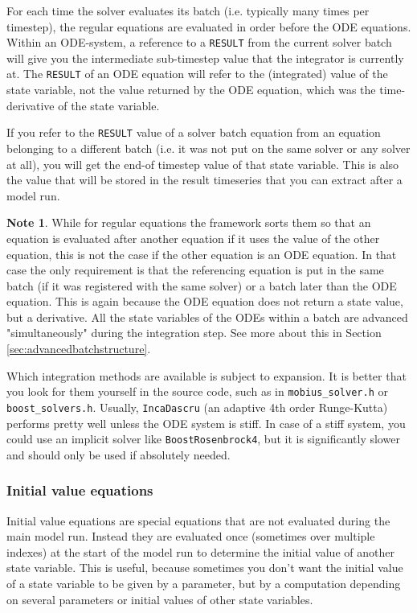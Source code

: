\documentclass[11pt]{article}
\theoremstyle{definition}
\newtheorem{mynote}{Note}
\newenvironment{note}%
  {\begin{lrbox}{\notebox}%
   \begin{minipage}{\dimexpr\linewidth-2\fboxsep}
   \begin{mynote}}%
  {\end{mynote}%
   \end{minipage}%
   \end{lrbox}%
   \begin{trivlist}
     \item[]\colorbox{silver}{\usebox\notebox}
   \end{trivlist}}
\begin{document}
For each time the solver evaluates its batch (i.e. typically many times per timestep), the regular equations are evaluated in order before the ODE equations. Within an ODE-system, a reference to a {\tt RESULT} from the current solver batch will give you the intermediate sub-timestep value that the integrator is currently at. The {\tt RESULT} of an ODE equation will refer to the (integrated) value of the state variable, not the value returned by the ODE equation, which was the time-derivative of the state variable.

If you refer to the {\tt RESULT} value of a solver batch equation from an equation belonging to a different batch (i.e. it was not put on the same solver or any solver at all), you will get the end-of timestep value of that state variable. This is also the value that will be stored in the result timeseries that you can extract after a model run.

\begin{note}
While for regular equations the framework sorts them so that an equation is evaluated after another equation if it uses the value of the other equation, this is not the case if the other equation is an ODE equation. In that case the only requirement is that the referencing equation is put in the same batch (if it was registered with the same solver) or a batch later than the ODE equation. This is again because the ODE equation does not return a state value, but a derivative. All the state variables of the ODEs within a batch are advanced "simultaneously" during the integration step. See more about this in Section \ref{sec:advancedbatchstructure}.
\end{note}

Which integration methods are available is subject to expansion. It is better that you look for them yourself in the source code, such as in {\tt mobius\_solver.h} or {\tt boost\_solvers.h}. Usually, {\tt IncaDascru} (an adaptive 4th order Runge-Kutta) performs pretty well unless the ODE system is stiff. In case of a stiff system, you could use an implicit solver like {\tt BoostRosenbrock4}, but it is significantly slower and should only be used if absolutely needed.

\subsubsection{Initial value equations}

Initial value equations are special equations that are not evaluated during the main model run. Instead they are evaluated once (sometimes over multiple indexes) at the start of the model run to determine the initial value of another state variable. This is useful, because sometimes you don't want the initial value of a state variable to be given by a parameter, but by a computation depending on several parameters or initial values of other state variables.
\end{document}
